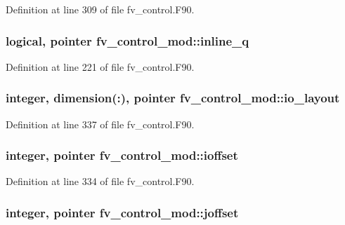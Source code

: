 Definition at line 309 of file fv\-\_\-control.\-F90.

\subsubsection[{inline\-\_\-q}]{\setlength{\rightskip}{0pt plus 5cm}logical, pointer fv\-\_\-control\-\_\-mod\-::inline\-\_\-q\hspace{0.3cm}{\ttfamily [private]}}\label{classfv__control__mod_afcc0691ad688ba6c0403a246913ce4b8}


Definition at line 221 of file fv\-\_\-control.\-F90.

\subsubsection[{io\-\_\-layout}]{\setlength{\rightskip}{0pt plus 5cm}integer, dimension(\-:), pointer fv\-\_\-control\-\_\-mod\-::io\-\_\-layout\hspace{0.3cm}{\ttfamily [private]}}\label{classfv__control__mod_a98f797f3a34e834e28ecad3a99ea2a06}


Definition at line 337 of file fv\-\_\-control.\-F90.

\subsubsection[{ioffset}]{\setlength{\rightskip}{0pt plus 5cm}integer, pointer fv\-\_\-control\-\_\-mod\-::ioffset\hspace{0.3cm}{\ttfamily [private]}}\label{classfv__control__mod_a931b77a75c5dcd01595b45112bae9638}


Definition at line 334 of file fv\-\_\-control.\-F90.

\subsubsection[{joffset}]{\setlength{\rightskip}{0pt plus 5cm}integer, pointer fv\-\_\-control\-\_\-mod\-::joffset\hspace{0.3cm}{\ttfamily [private]}}\label{classfv__control__mod_a9ff9b60e60c1a2f85df3abf9ade7d57d}


